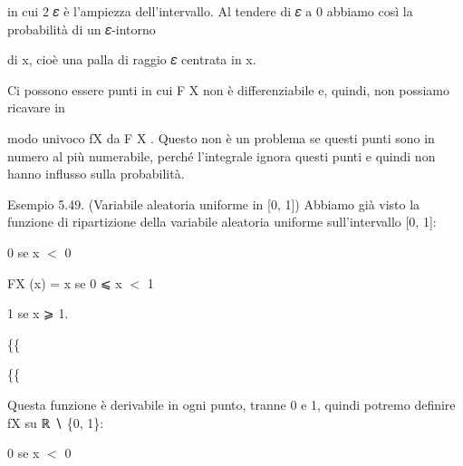 \documentclass[a4paper,portrait,12pt]{article}
\begin{document}
\begin{flushleft}
in cui 2 𝜀 \`{e} l'ampiezza dell'intervallo. Al tendere di 𝜀 a 0 abbiamo così la probabilit\`{a} di un 𝜀-intorno
\end{flushleft}


\begin{flushleft}
di x, cio\`{e} una palla di raggio 𝜀 centrata in x.
\end{flushleft}


\begin{flushleft}
Ci possono essere punti in cui F X non \`{e} differenziabile e, quindi, non possiamo ricavare in
\end{flushleft}


\begin{flushleft}
modo univoco fX da F X . Questo non \`{e} un problema se questi punti sono in numero al più numerabile, perch\'{e} l'integrale ignora questi punti e quindi non hanno influsso sulla probabilit\`{a}.
\end{flushleft}


\begin{flushleft}
Esempio 5.49. (Variabile aleatoria uniforme in [0, 1]) Abbiamo gi\`{a} visto la funzione di ripartizione della variabile aleatoria uniforme sull'intervallo [0, 1]:
\end{flushleft}


\begin{flushleft}
0 se x $<$ 0
\end{flushleft}


\begin{flushleft}
FX (x) = x se 0 ⩽ x $<$ 1
\end{flushleft}


\begin{flushleft}
1 se x ⩾ 1.
\end{flushleft}





\{\{


\{\{





\begin{flushleft}
Questa funzione \`{e} derivabile in ogni punto, tranne 0 e 1, quindi potremo definire fX su ℝ ∖ \{0, 1\}:
\end{flushleft}


\begin{flushleft}
0 se x $<$ 0
\end{flushleft}
\end{document}
